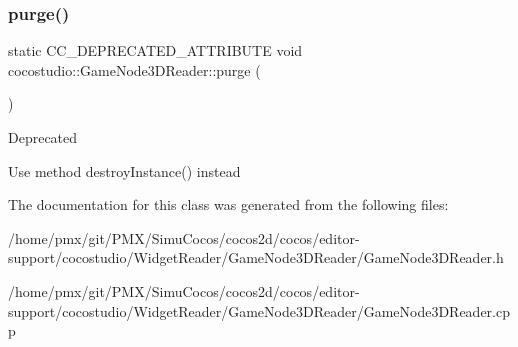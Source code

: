 \subsubsection{\texorpdfstring{purge()}{purge()}\hspace{0.1cm}{\footnotesize\ttfamily [2/2]}}
{\footnotesize\ttfamily static C\+C\+\_\+\+D\+E\+P\+R\+E\+C\+A\+T\+E\+D\+\_\+\+A\+T\+T\+R\+I\+B\+U\+TE void cocostudio\+::\+Game\+Node3\+D\+Reader\+::purge (\begin{DoxyParamCaption}{ }\end{DoxyParamCaption})\hspace{0.3cm}{\ttfamily [static]}}

\begin{DoxyRefDesc}{Deprecated}
\item[\hyperlink{deprecated__deprecated000323}{Deprecated}]Use method destroy\+Instance() instead \end{DoxyRefDesc}


The documentation for this class was generated from the following files\+:\begin{DoxyCompactItemize}
\item 
/home/pmx/git/\+P\+M\+X/\+Simu\+Cocos/cocos2d/cocos/editor-\/support/cocostudio/\+Widget\+Reader/\+Game\+Node3\+D\+Reader/Game\+Node3\+D\+Reader.\+h\item 
/home/pmx/git/\+P\+M\+X/\+Simu\+Cocos/cocos2d/cocos/editor-\/support/cocostudio/\+Widget\+Reader/\+Game\+Node3\+D\+Reader/Game\+Node3\+D\+Reader.\+cpp\end{DoxyCompactItemize}
